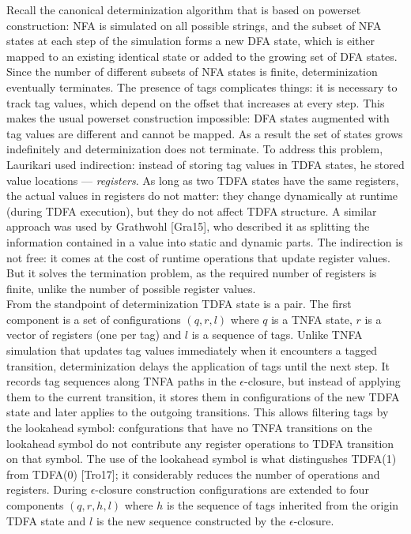 \documentclass[]{article}
\begin{document}
Recall the canonical determinization algorithm that is based on powerset construction:
NFA is simulated on all possible strings,
and the subset of NFA states at each step of the simulation forms a new DFA state,
which is either mapped to an existing identical state or added to the growing set of DFA states.
Since the number of different subsets of NFA states is finite, determinization eventually terminates.
%
The presence of tags complicates things: it is necessary to track tag values, which depend on the offset that increases at every step.
This makes the usual powerset construction impossible: DFA states augmented with tag values are different and cannot be mapped.
As a result the set of states grows indefinitely and determinization does not terminate.
%
To address this problem, Laurikari used indirection: instead of storing tag values in TDFA states, he stored value locations --- \emph{registers}.
As long as two TDFA states have the same registers, the actual values in registers do not matter:
they change dynamically at runtime (during TDFA execution), but they do not affect TDFA structure.
A similar approach was used by Grathwohl [Gra15], who described it as splitting the information contained in a value into static and dynamic parts.
The indirection is not free: it comes at the cost of runtime operations that update register values.
But it solves the termination problem, as the required number of registers is finite, unlike the number of possible register values.
\\

From the standpoint of determinization TDFA state is a pair.
The first component is a set of configurations $(q, r, l)$ where
$q$ is a TNFA state,
$r$ is a vector of registers (one per tag) and
$l$ is a sequence of tags.
Unlike TNFA simulation that updates tag values immediately when it encounters a tagged transition,
determinization delays the application of tags until the next step.
%
It records tag sequences along TNFA paths in the $\epsilon$-closure,
but instead of applying them to the current transition,
it stores them in configurations of the new TDFA state
and later applies to the outgoing transitions.
%
This allows filtering tags by the lookahead symbol:
confgurations that have no TNFA transitions on the lookahead symbol
do not contribute any register operations to TDFA transition on that symbol.
The use of the lookahead symbol is what distingushes TDFA(1) from TDFA(0) [Tro17];
it considerably reduces the number of operations and registers.
During $\epsilon$-closure construction configurations are extended to four components $(q, r, h, l)$
where $h$ is the sequence of tags inherited from the origin TDFA state
and $l$ is the new sequence constructed by the $\epsilon$-closure.
\\
\end{document}
